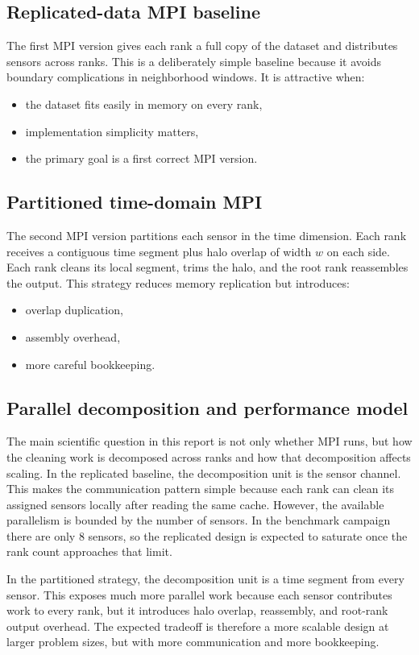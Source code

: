 \documentclass[11pt]{article}
\begin{document}
\subsection{Replicated-data MPI baseline}
The first MPI version gives each rank a full copy of the dataset and distributes sensors across ranks. This is a deliberately simple baseline because it avoids boundary complications in neighborhood windows. It is attractive when:
\begin{itemize}
  \item the dataset fits easily in memory on every rank,
  \item implementation simplicity matters,
  \item the primary goal is a first correct MPI version.
\end{itemize}

\subsection{Partitioned time-domain MPI}
The second MPI version partitions each sensor in the time dimension. Each rank receives a contiguous time segment plus halo overlap of width $w$ on each side. Each rank cleans its local segment, trims the halo, and the root rank reassembles the output. This strategy reduces memory replication but introduces:
\begin{itemize}
  \item overlap duplication,
  \item assembly overhead,
  \item more careful bookkeeping.
\end{itemize}

\subsection{Parallel decomposition and performance model}
The main scientific question in this report is not only whether MPI runs, but how the cleaning work is decomposed across ranks and how that decomposition affects scaling. In the replicated baseline, the decomposition unit is the sensor channel. This makes the communication pattern simple because each rank can clean its assigned sensors locally after reading the same cache. However, the available parallelism is bounded by the number of sensors. In the benchmark campaign there are only 8 sensors, so the replicated design is expected to saturate once the rank count approaches that limit.

In the partitioned strategy, the decomposition unit is a time segment from every sensor. This exposes much more parallel work because each sensor contributes work to every rank, but it introduces halo overlap, reassembly, and root-rank output overhead. The expected tradeoff is therefore a more scalable design at larger problem sizes, but with more communication and more bookkeeping.
\end{document}
